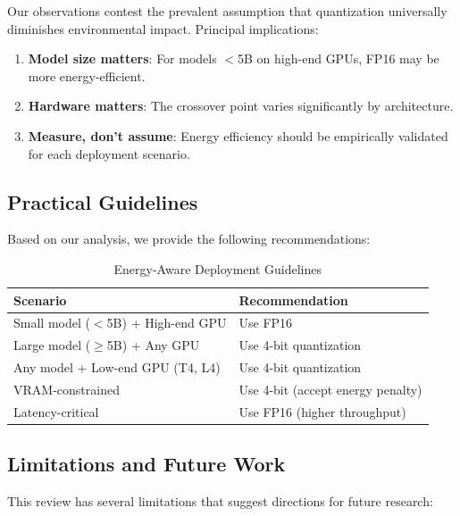 \documentclass[11pt]{article}
\begin{document}
Our observations contest the prevalent assumption that quantization universally diminishes environmental impact. Principal implications:

\begin{enumerate}
    \item \textbf{Model size matters}: For models $<$5B on high-end GPUs, FP16 may be more energy-efficient.
    
    \item \textbf{Hardware matters}: The crossover point varies significantly by architecture.
    
    \item \textbf{Measure, don't assume}: Energy efficiency should be empirically validated for each deployment scenario.
\end{enumerate}

\subsection{Practical Guidelines}

Based on our analysis, we provide the following recommendations:

\begin{table}[h]
\centering
\caption{Energy-Aware Deployment Guidelines}
\label{tab:guidelines}
\begin{tabular}{ll}
\toprule
\textbf{Scenario} & \textbf{Recommendation} \\
\midrule
Small model ($<$5B) + High-end GPU & Use FP16 \\
Large model ($\geq$5B) + Any GPU & Use 4-bit quantization \\
Any model + Low-end GPU (T4, L4) & Use 4-bit quantization \\
VRAM-constrained & Use 4-bit (accept energy penalty) \\
Latency-critical & Use FP16 (higher throughput) \\
\bottomrule
\end{tabular}
\end{table}

\subsection{Limitations and Future Work}

This review has several limitations that suggest directions for future research:
\end{document}
